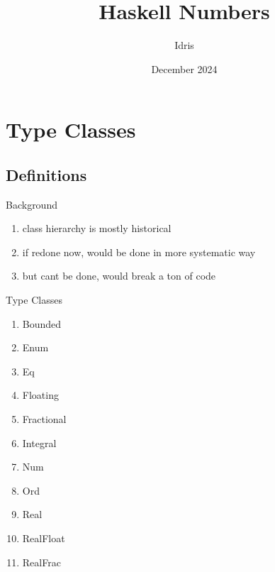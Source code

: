 \documentclass[openany, 11pt]{book}
\title{Haskell Numbers}
\author{Idris}
\date{December 2024}
\begin{document}
\maketitle{}
\tableofcontents
{}

\chapter{Type Classes}
\section{Definitions}
\begin{definition}{Background}{}
	\begin{enumerate}[label = {(\arabic*)}]
		\item class hierarchy is mostly historical
		\item if redone now, would be done in more systematic way
		\item but cant be done, would break a ton of code
	\end{enumerate}
\end{definition}

\begin{definition}{Type Classes}{}
	\begin{multicols}{2}
		\begin{enumerate}[label = {(\arabic*)}]
			\item Bounded
			\item Enum
			\item Eq
			\item Floating
			\item Fractional
			\item Integral
			\item Num
			\item Ord
			\item Real
			\item RealFloat
			\item RealFrac
		\end{enumerate}
	\end{multicols}
\end{definition}
\end{document}
